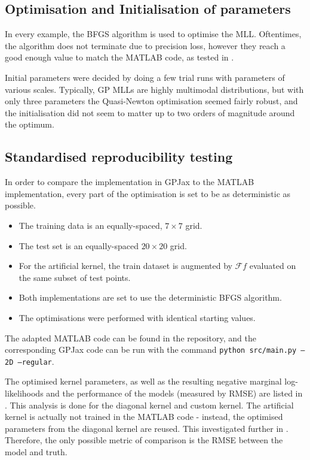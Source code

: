 \documentclass[12pt,a4paper,twoside]{report}
\theoremstyle{definition}
\begin{document}
\subsection{Optimisation and Initialisation of parameters}
In every example, the BFGS algorithm is used to optimise the MLL. Oftentimes, the algorithm does not terminate due to precision loss, however they reach a good enough value to match the MATLAB code, as tested in . 

Initial parameters were decided by doing a few trial runs with parameters of various scales. Typically, GP MLLs are highly multimodal distributions, but with only three parameters the Quasi-Newton optimisation seemed fairly robust, and the initialisation did not seem to matter up to two orders of magnitude around the optimum.

\subsection{Standardised reproducibility testing}\label{reproducibility}
In order to compare the implementation in GPJax to the MATLAB implementation, every part of the optimisation is set to be as deterministic as possible.

\begin{itemize}
	\item The training data is an equally-spaced, $7\times 7$ grid.
	\item The test set is an equally-spaced $20\times 20$ grid. 
	\item For the artificial kernel, the train dataset is augmented by $\mathscr F f$ evaluated on the same subset of test points.
	\item Both implementations are set to use the deterministic BFGS algorithm.
	\item The optimisations were performed with identical starting values.
\end{itemize}

The adapted MATLAB code can be found in the repository, and the corresponding GPJax code can be run with the command \texttt{python src/main.py --2D --regular}.

The optimised kernel parameters, as well as the resulting negative marginal log-likelihoods and the performance of the models (measured by RMSE) are listed in . This analysis is done for the diagonal kernel and custom kernel. The artificial kernel is actually not trained in the MATLAB code - instead, the optimised parameters from the diagonal kernel are reused. This investigated further in . Therefore, the only possible metric of comparison is the RMSE between the model and truth.
\end{document}
